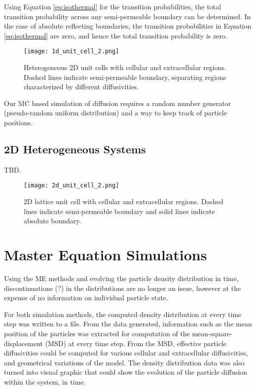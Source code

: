 	Using Equation \ref{eq:isothermal} for the transition probabilities, the total transition probability across any semi-permeable boundary can be determined. In the case of absolute reflecting boundaries, the transition probabilities in Equation \ref{eq:isothermal} are zero, and hence the total transition probability is zero.
	
	\begin{figure}[h]
		\centering
		\texttt{[image: 1d\_unit\_cell\_2.png]}
		\caption{Heterogeneous 2D unit cells with cellular and extracellular regions. Dashed lines indicate semi-permeable boundary, separating regions characterized by different diffusivities.}
		\label{fig:1d_unit_cell_2.png}
	\end{figure}
	
	\newpage
	Our MC based simulation of diffusion requires a random number generator (pseudo-random uniform distribution) and a way to keep track of particle positions.


\subsection{2D Heterogeneous Systems}
	TBD.
	
	\begin{figure}[h]
		\centering
		\texttt{[image: 2d\_unit\_cell\_2.png]}
		\caption{2D lattice unit cell with cellular and extracellular regions. Dashed lines indicate semi-permeable boundary and solid lines indicate absolute boundary.}
		\label{fig:2d_unit_cell_2.png}
	\end{figure}

\section{Master Equation Simulations}

	
	Using the ME methods and evolving the particle density distribution in time, discontinuations (?) in the distributions are no longer an issue, however at the expense of no information on individual particle state.
	
	For both simulation methods, the computed density distribution at every time step was written to a file. From the data generated, information such as the mean position of the particles was extracted for computation of the mean-square-displacement (MSD) at every time step. From the MSD, effective particle diffusivities could be computed for various cellular and extracellular diffusivities, and geometrical variations of the model. The density distribution data was also turned into visual graphic that could show the evolution of the particle diffusion within the system, in time.
	
